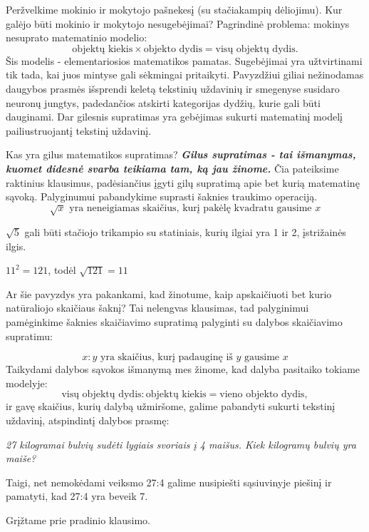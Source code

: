 \documentclass{article}
\begin{document}
Peržvelkime mokinio ir mokytojo pašnekesį (su stačiakampių dėliojimu). Kur galėjo būti mokinio ir mokytojo nesugebėjimai? Pagrindinė problema: mokinys nesuprato matematinio modelio:
$$\text{objektų kiekis}\times\text{objekto dydis}=\text{visų objektų dydis}.$$
Šis modelis - elementariosios matematikos pamatas. Sugebėjimai yra užtvirtinami tik tada, kai juos mintyse gali sėkmingai pritaikyti. Pavyzdžiui giliai nežinodamas daugybos prasmės išsprendi keletą tekstinių uždavinių ir smegenyse susidaro neuronų jungtys, padedančios atskirti kategorijas dydžių, kurie gali būti dauginami. Dar gilesnis supratimas yra gebėjimas sukurti matematinį modelį pailiustruojantį tekstinį uždavinį. 
\begin{mybox}{Kas yra gilus matematikos supratimas?}
\textit{\textbf{Gilus supratimas - tai išmanymas, kuomet didesnė svarba teikiama tam, ką jau žinome.}} Čia pateiksime raktinius klausimus, padėsiančius įgyti gilų supratimą apie bet kurią matematinę sąvoką.
Palyginumui pabandykime suprasti šaknies traukimo operaciją. 
$$\sqrt{x} \text{ yra neneigiamas skaičius, kurį pakėlę kvadratu gausime }x$$

$\sqrt{5}$ gali būti stačiojo trikampio su statiniais, kurių ilgiai yra 1 ir 2, įstrižainės ilgis.

$11^2 = 121$, todėl $\sqrt{121}=11$

Ar šie pavyzdys yra pakankami, kad žinotume, kaip apskaičiuoti bet kurio natūraliojo skaičiaus šaknį? Tai nelengvas klausimas, tad palyginimui pamėginkime šaknies skaičiavimo supratimą palyginti su dalybos skaičiavimo supratimu:

\begin{mdframed}[backgroundcolor=blue!5!white]
$$x:y \text{ yra skaičius, kurį padauginę iš $y$ gausime }x$$
Taikydami dalybos sąvokos išmanymą mes žinome, kad dalyba pasitaiko tokiame modelyje:
$$\text{visų objektų dydis}:\text{objektų kiekis}=\text{vieno objekto dydis},$$
ir gavę skaičius, kurių dalybą užmiršome, galime pabandyti sukurti tekstinį uždavinį, atspindintį dalybos prasmę:

\textit{27 kilogramai bulvių sudėti lygiais svoriais į 4 maišus. Kiek kilogramų bulvių yra maiše?}

Taigi, net nemokėdami veiksmo 27:4 galime nusipiešti sąsiuvinyje piešinį ir pamatyti, kad 27:4 yra beveik 7. 
\end{mdframed}

Grįžtame prie pradinio klausimo. 


\end{mybox}
\end{document}
